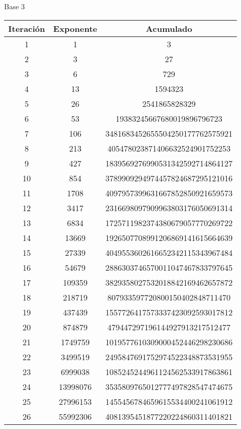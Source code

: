 \documentclass[fleqn]{article}
\begin{document}
\begin{center}
        \newpage Base 3
        \begin{tabular}{c | c | c}
            Iteración & Exponente & Acumulado \\ \hline
            1 & 1 & 3 \\
            2 & 3 & 27 \\
            3 & 6 & 729 \\
            4 & 13 & 1594323 \\
            5 & 26 & 2541865828329 \\
            6 & 53 & 19383245667680019896796723 \\
            7 & 106 & 3481683452655504250177762575921 \\
            8 & 213 & 405478023871406632524901752253 \\
            9 & 427 & 1839569276990531342592714864127 \\
            10 & 854 & 3789909294974457824687295121016 \\
            11 & 1708 & 4097957399631667852850921659573 \\
            12 & 3417 & 2316698097909963803176050691314 \\
            13 & 6834 & 1725711982374380679057770269722 \\
            14 & 13669 & 1926507708991206869141615664639 \\
            15 & 27339 & 4049553602616652342115343967484 \\
            16 & 54679 & 2886303746570011047467833797645 \\
            17 & 109359 & 3829358027532018842169462657872 \\
            18 & 218719 & 807933597720800150402848711470 \\
            19 & 437439 & 1557726417573337423092593017812 \\
            20 & 874879 & 479447297196144927913217512477 \\
            21 & 1749759 & 1019577610309000452446298230686 \\
            22 & 3499519 & 2495847691752974522348873531955 \\
            23 & 6999038 & 1085245244961124562533917863861 \\
            24 & 13998076 & 3535809765012777497828547474675 \\
            25 & 27996153 & 1455456784659615534400241061912 \\
            26 & 55992306 & 4081395451877220224860311401821 \\

\end{tabular}
\end{center}
\end{document}

